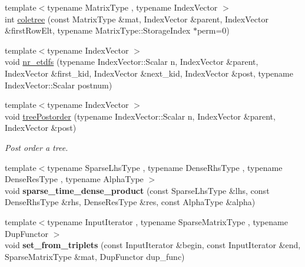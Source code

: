 \begin{DoxyCompactItemize}
\item 
{\footnotesize template$<$typename Matrix\+Type , typename Index\+Vector $>$ }\\int \hyperlink{namespace_eigen_1_1internal_a86181db74ba596a7afbfd89efcc5788c}{coletree} (const Matrix\+Type \&mat, Index\+Vector \&parent, Index\+Vector \&first\+Row\+Elt, typename Matrix\+Type\+::\+Storage\+Index $\ast$perm=0)
\item 
{\footnotesize template$<$typename Index\+Vector $>$ }\\void \hyperlink{namespace_eigen_1_1internal_acbd726e03f667e0dc788c6b4e92d61ec}{nr\+\_\+etdfs} (typename Index\+Vector\+::\+Scalar n, Index\+Vector \&parent, Index\+Vector \&first\+\_\+kid, Index\+Vector \&next\+\_\+kid, Index\+Vector \&post, typename Index\+Vector\+::\+Scalar postnum)
\item 
{\footnotesize template$<$typename Index\+Vector $>$ }\\void \hyperlink{namespace_eigen_1_1internal_ab414b5990bd6c865958a9231ff418d20}{tree\+Postorder} (typename Index\+Vector\+::\+Scalar n, Index\+Vector \&parent, Index\+Vector \&post)
\begin{DoxyCompactList}\small\item\em Post order a tree. \end{DoxyCompactList}\item 
\mbox{\label{namespace_eigen_1_1internal_acf3ec87c63d7c9de83c0141f968df7ae}} 
{\footnotesize template$<$typename Sparse\+Lhs\+Type , typename Dense\+Rhs\+Type , typename Dense\+Res\+Type , typename Alpha\+Type $>$ }\\void {\bfseries sparse\+\_\+time\+\_\+dense\+\_\+product} (const Sparse\+Lhs\+Type \&lhs, const Dense\+Rhs\+Type \&rhs, Dense\+Res\+Type \&res, const Alpha\+Type \&alpha)
\item 
\mbox{\label{namespace_eigen_1_1internal_ae578c425d1ff2ad3d8934b4c2498e852}} 
{\footnotesize template$<$typename Input\+Iterator , typename Sparse\+Matrix\+Type , typename Dup\+Functor $>$ }\\void {\bfseries set\+\_\+from\+\_\+triplets} (const Input\+Iterator \&begin, const Input\+Iterator \&end, Sparse\+Matrix\+Type \&mat, Dup\+Functor dup\+\_\+func)
\item 
\mbox{\label{namespace_eigen_1_1internal_a774ca83200adf7454852c72fa7685384}} 

\end{DoxyCompactItemize}
